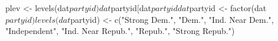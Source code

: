\begin{Schunk}
\begin{Sinput}
 plev <- levels(dat$partyid)
 dat$partyid[dat$partyid %in% plev[8]] <- NA
 dat$partyid <- factor(dat$partyid)
 levels(dat$partyid) <- c("Strong Dem.", "Dem.", "Ind. Near Dem.", "Independent", "Ind. Near Repub.", "Repub.", "Strong Repub.")
\end{Sinput}
\end{Schunk}
